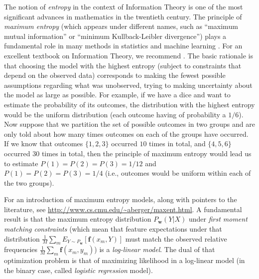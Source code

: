 The notion of \emph{entropy} in the context of Information Theory \citep{Shannon1948} is one of the most significant advances 
in mathematics in the twentieth century. The principle of \emph{maximum entropy} (which appears under different names, 
such as ``maximum mutual information'' or  ``minimum Kullback-Leibler divergence'') plays a fundamental role 
in many methods in statistics and machine learning \citep{Jaynes1982}. 
For an excellent textbook on Information Theory, we recommend \citet{Cover1991}. 
The basic rationale is that choosing the model with the highest entropy (subject to 
constraints that depend on the observed data) corresponds to making the fewest 
possible assumptions regarding what was unobserved, trying to making uncertainty 
about the model as large as possible. For example, if we have a dice and want to estimate 
the probability of its outcomes, the distribution with the highest entropy would be the 
uniform distribution (each outcome having of probability a $1/6$). 
Now suppose that we partition the set of possible outcomes in two groups and are only told about how many 
times outcomes on each of the groups have occurred. 
If we know that outcomes $\{1,2,3\}$ occurred $10$ times in total, and 
$\{4,5,6\}$ occurred $30$ times in total, then the principle of maximum entropy would lead us to 
estimate $P(1)=P(2)=P(3)=1/12$ and $P(1)=P(2)=P(3)=1/4$ (i.e., outcomes would be uniform 
within each of the two groups). 

For an introduction of maximum entropy models, along with pointers to the literature, see 
\url{http://www.cs.cmu.edu/~aberger/maxent.html}. A fundamental result is that 
the maximum entropy distribution $P_{\boldsymbol{w}}(Y|X)$ under \emph{first moment matching constraints} (which mean that 
feature expectations under that distribution $\frac{1}{M}\sum_m E_{Y \sim P_{\boldsymbol{w}}}[\boldsymbol{f}(x_m,Y)]$ 
must match the observed relative frequencies 
 $\frac{1}{M}\sum_m \boldsymbol{f}(x_m,y_m)$) 
is a \emph{log-linear model}. The dual of that optimization problem is that of 
maximizing likelihood in a log-linear model (in the binary case, called \emph{logistic regression} model). 

